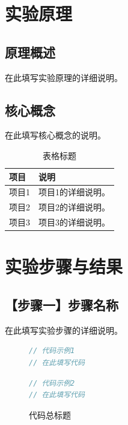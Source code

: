 \documentclass[a4paper]{article}
\begin{document}
\newpage

\section{实验原理}

\subsection{原理概述}
在此填写实验原理的详细说明。

\subsection{核心概念}
在此填写核心概念的说明。

\begin{table}[htbp]
\centering
\label{tab:example}
\begin{tabular}{|>{\raggedright\arraybackslash}p{}|>{\raggedright\arraybackslash}p{}|}
\hline
\textbf{项目} & \textbf{说明} \\
\hline
项目1 & 项目1的详细说明。\\
\hline
项目2 & 项目2的详细说明。\\
\hline
项目3 & 项目3的详细说明。\\
\hline
\end{tabular}
\caption{表格标题}
\end{table}

\newpage

\section{实验步骤与结果}

\subsection{【步骤一】步骤名称}
在此填写实验步骤的详细说明。

\begin{figure}[H]
  \centering
  \begin{minipage}[t]{0.48\textwidth}
    \begin{lstlisting}[language=C, xleftmargin=0pt]
// 代码示例1
// 在此填写代码
    \end{lstlisting}
  \end{minipage}\hfill
  \begin{minipage}[t]{0.48\textwidth}
    \begin{lstlisting}[language=C, xleftmargin=0pt]
// 代码示例2
// 在此填写代码
    \end{lstlisting}
  \end{minipage}
  \caption{代码总标题}
\end{figure}
\end{document}

